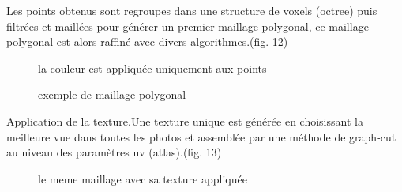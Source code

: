 \documentclass[a4paper,10pt,french]{sphinxhowto}
\begin{document}
Les points obtenus sont regroupes dans une structure de voxels (octree) puis filtrées et maillées pour générer un premier maillage polygonal,
ce maillage polygonal est alors raffiné avec divers algorithmes.(fig. 12)
\begin{figure}[htbp]
\centering
\capstart

\caption{exemple de maillage polygonal}{\small 
la couleur est appliquée uniquement aux points
}\end{figure}

Application de la texture.Une texture unique est générée en choisissant la meilleure vue dans toutes les photos et assemblée par une méthode de graph-cut au niveau des paramètres uv (atlas).(fig. 13)
\begin{figure}[htbp]
\centering
\capstart

\caption{le meme maillage avec sa texture appliquée}\end{figure}
\end{document}
